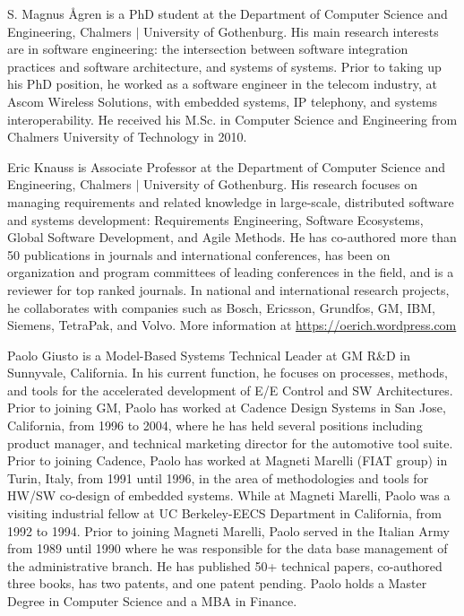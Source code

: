 \documentclass[10pt,journal,compsoc,letterpaper]{IEEEtran}
\begin{document}
\begin{IEEEbiography}{S. Magnus Ågren}
is a PhD student at the Department of Computer Science and Engineering, Chalmers $\mid$ University of Gothenburg.
His main research interests are in software engineering: the intersection between software integration practices and software architecture, and systems of systems.
Prior to taking up his PhD position, he worked as a software engineer in the telecom industry, at Ascom Wireless Solutions, with embedded systems, IP telephony, and systems interoperability.
He received his M.Sc. in Computer Science and Engineering from Chalmers University of Technology in 2010.
\end{IEEEbiography}

\begin{IEEEbiography}{Eric Knauss}
is Associate Professor at the Department of Computer Science and Engineering, Chalmers $\mid$ University of Gothenburg.
His research focuses on managing requirements and related knowledge in large-scale, distributed software and systems development: Requirements Engineering, Software Ecosystems, Global Software Development, and Agile Methods.
He has co-authored more than 50 publications in journals and international conferences, has been on organization and program committees of leading conferences in the field, and is a reviewer for top ranked journals.
In national and international research projects, he collaborates with companies such as Bosch, Ericsson, Grundfos, GM, IBM, Siemens, TetraPak, and Volvo.
More information at \url{https://oerich.wordpress.com}
\end{IEEEbiography}

\vfill
\newpage

\begin{IEEEbiography}{Paolo Giusto}
is a Model-Based Systems Technical Leader at GM R\&D in Sunnyvale, California.
In his current function, he focuses on processes, methods, and tools for the accelerated development of E/E Control and SW Architectures.
Prior to joining GM, Paolo has worked at Cadence Design Systems in San Jose, California, from 1996 to  2004, where he has held several positions including product manager, and technical marketing director for the automotive tool suite.
Prior to joining Cadence, Paolo has worked at Magneti Marelli (FIAT group) in Turin, Italy, from 1991 until 1996, in the area of methodologies and tools for HW/SW co-design of embedded systems.
While at Magneti Marelli, Paolo was a visiting industrial fellow at UC Berkeley-EECS Department in California, from 1992 to 1994.
Prior to joining Magneti Marelli, Paolo served in the Italian Army from 1989 until 1990 where he was responsible for the data base management of the administrative branch.
He has published 50+ technical papers, co-authored three books, has two patents, and one patent pending.
Paolo holds a Master Degree in Computer Science and a MBA in Finance.
\end{IEEEbiography}
\end{document}

